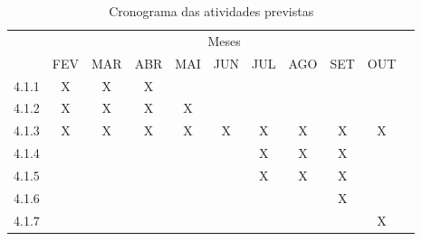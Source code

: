 \begin{table}[!htpb]
\centering

\begin{small} 
  
\setlength{\tabcolsep}{3pt} 


\begin{tabular}{|c|c|c|c|c|c|c|c|c|c|c|}\hline
 & \multicolumn{9}{c|}{Meses}\\ \cline{2-10}
\raisebox{1.5ex}{Etapa} & FEV & MAR & ABR & MAI & JUN & JUL & AGO & SET & OUT \\ \hline

4.1.1 & X & X & X & & & & & &   \\ \hline
4.1.2 & X & X & X & X & & & & &   \\ \hline
4.1.3 & X & X & X & X & X & X & X & X & X    \\ \hline
4.1.4 & &  &  & &  & X & X & X &  \\ \hline
4.1.5 & &  &  & &  & X & X & X &    \\ \hline
4.1.6 & & & & & & & & X &   \\ \hline
4.1.7 & & & & & & & & & X  \\ \hline

\end{tabular} 
\end{small}
\caption{Cronograma das atividades previstas}
\label{t_cronograma}
\end{table} 






